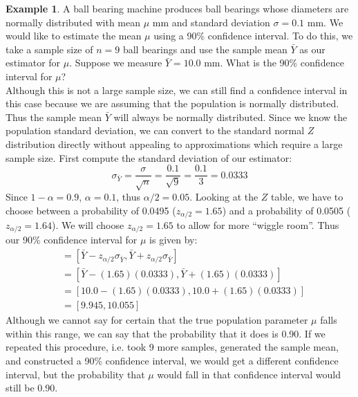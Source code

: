 \documentclass[12pt]{article}
\theoremstyle{definition}
\newtheorem*{example}{Example}
\theoremstyle{remark}
\begin{document}
\begin{example}A ball bearing machine produces ball bearings whose diameters are normally distributed with mean $\mu$ mm and standard deviation $\sigma = 0.1$ mm. We would like to estimate the mean $\mu$ using a 90\% confidence interval. To do this, we take a sample size of $n = 9$ ball bearings and use the sample mean $\bar{Y}$ as our estimator for $\mu$. Suppose we measure $\bar{Y} = 10.0$ mm. What is the 90\% confidence interval for $\mu$?\\

Although this is not a large sample size, we can still find a confidence interval in this case because we are assuming that the population is normally distributed. Thus the sample mean $\bar{Y}$ will always be normally distributed. Since we know the population standard deviation, we can convert to the standard normal $Z$ distribution directly without appealing to approximations which require a large sample size. First compute the standard deviation of our estimator:
\[
\sigma_{\bar{Y}} = \frac{\sigma}{\sqrt{n}} = \frac{0.1}{\sqrt{9}} = \frac{0.1}{3} = 0.0333
\]
Since $1 - \alpha = 0.9$, $\alpha = 0.1$, thus $\alpha / 2 = 0.05$. Looking at the $Z$ table, we have to choose between a probability of 0.0495 ($z_{\alpha/2} = 1.65$) and a probability of 0.0505 ($z_{\alpha/2} = 1.64$). We will choose $z_{\alpha/2} = 1.65$ to allow for more ``wiggle room''. Thus our 90\% confidence interval for $\mu$ is given by:
\begin{align*}
[\bar{Y}_L, \bar{Y}_U] &= [ \bar{Y} - z_{\alpha/2} \sigma_{\bar{Y}}, \bar{Y} + z_{\alpha/2} \sigma_{\bar{Y}} ] \\
&= [ \bar{Y} - (1.65)(0.0333), \bar{Y} + (1.65)(0.0333) ] \\
&= [ 10.0 - (1.65)(0.0333), 10.0 + (1.65)(0.0333) ] \\
&= [9.945, 10.055]
\end{align*}
Although we cannot say for certain that the true population parameter $\mu$ falls within this range, we can say that the probability that it does is 0.90. If we repeated this procedure, i.e. took 9 more samples, generated the sample mean, and constructed a 90\% confidence interval, we would get a different confidence interval, but the probability that $\mu$ would fall in that confidence interval would still be 0.90.
\end{example}
\end{document}

